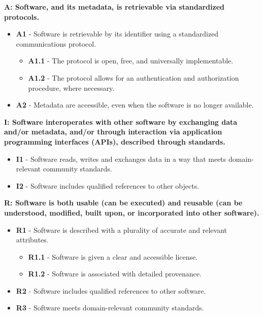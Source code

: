 \textbf{A: Software, and its metadata, is retrievable via standardized protocols.}

\begin{itemize}
    \item \textbf{A1} - Software is retrievable by its identifier using a standardized communications protocol.

    \begin{itemize}
        \item \textbf{A1.1} - The protocol is open, free, and universally implementable.
        \item \textbf{A1.2} - The protocol allows for an authentication and authorization procedure, where necessary.
    \end{itemize}

    \item \textbf{A2} - Metadata are accessible, even when the software is no longer available.
\end{itemize}

\textbf{I: Software interoperates with other software by exchanging data and/or metadata, and/or
through interaction via application programming interfaces (APIs), described through
standards.}

\begin{itemize}
    \item \textbf{I1} - Software reads, writes and exchanges data in a way that meets domain-relevant community standards.
    \item \textbf{I2} - Software includes qualified references to other objects.
\end{itemize}

\textbf{R: Software is both usable (can be executed) and reusable (can be understood, modified, built
upon, or incorporated into other software).}

\begin{itemize}
    \item \textbf{R1} - Software is described with a plurality of accurate and relevant attributes.

    \begin{itemize}
        \item \textbf{R1.1} - Software is given a clear and accessible license.
        \item \textbf{R1.2} - Software is associated with detailed provenance.
    \end{itemize}

    \item \textbf{R2} - Software includes qualified references to other software.
    \item \textbf{R3} - Software meets domain-relevant community standards.
\end{itemize}

